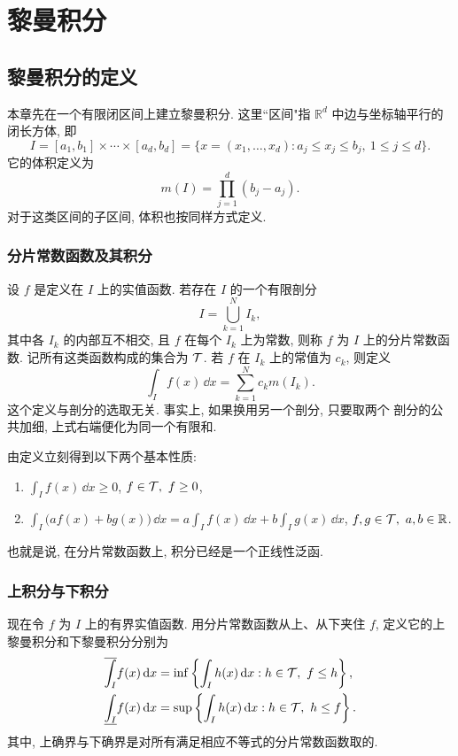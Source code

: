 \chapter{黎曼积分}

\section{黎曼积分的定义}

本章先在一个有限闭区间上建立黎曼积分. 这里``区间"指
\(\mathbb{R}^d\) 中边与坐标轴平行的闭长方体, 即
\[
I=[a_1,b_1]\times\cdots\times [a_d,b_d]
=\{x=(x_1,\ldots,x_d): a_j\leq x_j\leq b_j,\ 1\leq j\leq d\}.
\]
它的体积定义为
\[
m(I)=\prod_{j=1}^{d}(b_j-a_j).
\]
对于这类区间的子区间, 体积也按同样方式定义.

\subsection{分片常数函数及其积分}

设 \(f\) 是定义在 \(I\) 上的实值函数. 若存在 \(I\) 的一个有限剖分
\[
I=\bigcup_{k=1}^{N}I_k,
\]
其中各 \(I_k\) 的内部互不相交, 且 \(f\) 在每个 \(I_k\) 上为常数, 则称
\(f\) 为 \(I\) 上的分片常数函数. 记所有这类函数构成的集合为 \(\mathcal{T}\).
若 \(f\) 在 \(I_k\) 上的常值为 \(c_k\), 则定义
\[
\int_I f(x)\,\dd x=\sum_{k=1}^{N}c_k m(I_k).
\]
这个定义与剖分的选取无关. 事实上, 如果换用另一个剖分, 只要取两个
剖分的公共加细, 上式右端便化为同一个有限和.

由定义立刻得到以下两个基本性质:
\begin{enumerate}
	\item $\int_I f(x)\,\dd x\geq 0$, $f\in\mathcal{T},\ f\geq 0$, \label{eq:step-positive}
	\item $\int_I \bigl(af(x)+bg(x)\bigr)\,\dd x
	=a\int_I f(x)\,\dd x+b\int_I g(x)\,\dd x$, $f,g\in\mathcal{T},\ a,b\in\mathbb{R}$. \label{eq:step-linear}
\end{enumerate}
也就是说, 在分片常数函数上, 积分已经是一个正线性泛函.

\subsection{上积分与下积分}

现在令 \(f\) 为 \(I\) 上的有界实值函数. 用分片常数函数从上、从下夹住
\(f\), 定义它的上黎曼积分和下黎曼积分分别为
\begin{align}
	\overline{\int_I} f(x)\,\dd x
	&=\inf\left\{\int_I h(x)\,\dd x: h\in\mathcal{T},\ f\leq h\right\},\label{eq:upper-riemann}\\
	\underline{\int_I} f(x)\,\dd x
	&=\sup\left\{\int_I h(x)\,\dd x: h\in\mathcal{T},\ h\leq f\right\}.\label{eq:lower-riemann}
\end{align}
其中, 上确界与下确界是对所有满足相应不等式的分片常数函数取的.

